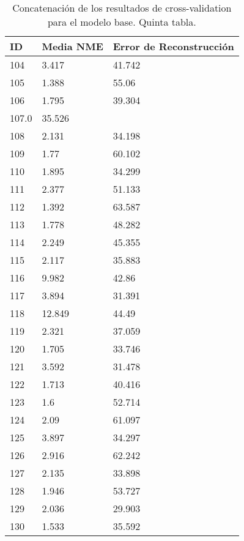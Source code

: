 \begin{table}[!ht]
    \centering
    \caption{Concatenación de los resultados de cross-validation para el modelo base. Quinta tabla.}
    \begin{tabular}{|l|l|l|}
    \hline
        \cellcolor{gray!25}\textbf{ID} & \cellcolor{gray!25}\textbf{Media NME} & \cellcolor{gray!25}\textbf{Error de Reconstrucción} \\ \hline
        104 & 3.417 & 41.742 \\ \hline
        105 & 1.388 & 55.06 \\ \hline
        106 & 1.795 & 39.304 \\ \hline
        107.0 & 35.526 & ~ \\ \hline
        108 & 2.131 & 34.198 \\ \hline
        109 & 1.77 & 60.102 \\ \hline
        110 & 1.895 & 34.299 \\ \hline
        111 & 2.377 & 51.133 \\ \hline
        112 & 1.392 & 63.587 \\ \hline
        113 & 1.778 & 48.282 \\ \hline
        114 & 2.249 & 45.355 \\ \hline
        115 & 2.117 & 35.883 \\ \hline
        116 & 9.982 & 42.86 \\ \hline
        117 & 3.894 & 31.391 \\ \hline
        118 & 12.849 & 44.49 \\ \hline
        119 & 2.321 & 37.059 \\ \hline
        120 & 1.705 & 33.746 \\ \hline
        121 & 3.592 & 31.478 \\ \hline
        122 & 1.713 & 40.416 \\ \hline
        123 & 1.6 & 52.714 \\ \hline
        124 & 2.09 & 61.097 \\ \hline
        125 & 3.897 & 34.297 \\ \hline
        126 & 2.916 & 62.242 \\ \hline
        127 & 2.135 & 33.898 \\ \hline
        128 & 1.946 & 53.727 \\ \hline
        129 & 2.036 & 29.903 \\ \hline
        130 & 1.533 & 35.592 \\ \hline
    \end{tabular}
    \label{table:ModelBase_landmarkresume}
\end{table}

\endinput
